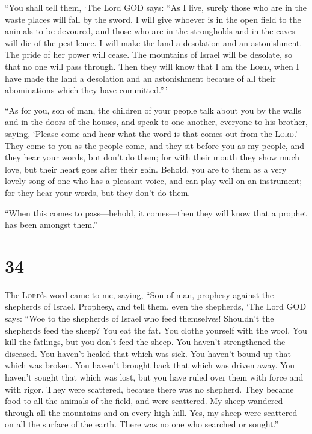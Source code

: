  ``You shall tell them, `The Lord GOD says: ``As I live,
surely those who are in the waste places will fall by the sword. I will
give whoever is in the open field to the animals to be devoured, and
those who are in the strongholds and in the caves will die of the
pestilence.  I will make the land a desolation and an
astonishment. The pride of her power will cease. The mountains of Israel
will be desolate, so that no one will pass through.  Then
they will know that I am the \textsc{Lord}, when I have made the land a
desolation and an astonishment because of all their abominations which
they have committed.''\,'

 ``As for you, son of man, the children of your people
talk about you by the walls and in the doors of the houses, and speak to
one another, everyone to his brother, saying, `Please come and hear what
the word is that comes out from the \textsc{Lord}.'  They
come to you as the people come, and they sit before you as my people,
and they hear your words, but don't do them; for with their mouth they
show much love, but their heart goes after their gain. 
Behold, you are to them as a very lovely song of one who has a pleasant
voice, and can play well on an instrument; for they hear your words, but
they don't do them.

 ``When this comes to pass---behold, it comes---then they
will know that a prophet has been amongst them.''

\hypertarget{section-33}{%
\section{34}\label{section-33}}

 The \textsc{Lord}'s word came to me, saying,
 ``Son of man, prophesy against the shepherds of Israel.
Prophesy, and tell them, even the shepherds, `The Lord GOD says: ``Woe
to the shepherds of Israel who feed themselves! Shouldn't the shepherds
feed the sheep?  You eat the fat. You clothe yourself with
the wool. You kill the fatlings, but you don't feed the sheep.
 You haven't strengthened the diseased. You haven't healed
that which was sick. You haven't bound up that which was broken. You
haven't brought back that which was driven away. You haven't sought that
which was lost, but you have ruled over them with force and with rigor.
 They were scattered, because there was no shepherd. They
became food to all the animals of the field, and were scattered.
 My sheep wandered through all the mountains and on every
high hill. Yes, my sheep were scattered on all the surface of the earth.
There was no one who searched or sought.''

